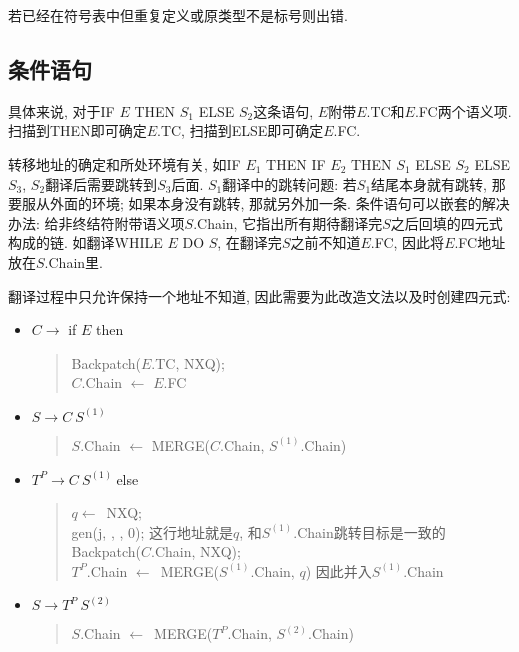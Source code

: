                 若已经在符号表中但重复定义或原类型不是标号则出错.

        \subsection{条件语句}

            具体来说, 对于IF $E$ THEN $S_1$ ELSE $S_2$这条语句, $E$附带$E$.TC和$E$.FC两个语义项. 扫描到THEN即可确定$E$.TC, 扫描到ELSE即可确定$E$.FC.

            转移地址的确定和所处环境有关, 如IF $E_1$ THEN IF $E_2$ THEN $S_1$ ELSE $S_2$ ELSE $S_3$, $S_2$翻译后需要跳转到$S_3$后面. $S_1$翻译中的跳转问题: 若$S_1$结尾本身就有跳转, 那要服从外面的环境; 如果本身没有跳转, 那就另外加一条. 条件语句可以嵌套的解决办法: 给非终结符附带语义项$S$.Chain, 它指出所有期待翻译完$S$之后回填的四元式构成的链. 如翻译WHILE $E$ DO $S$, 在翻译完$S$之前不知道$E$.FC, 因此将$E$.FC地址放在$S$.Chain里.

            翻译过程中只允许保持一个地址不知道, 因此需要为此改造文法以及时创建四元式: 

            \begin{itemize}
                \item $C\to$ if $E$ then 
                    \begin{verse}
                        Backpatch($E$.TC, NXQ); \\
                        $C$.Chain $\gets$ $E$.FC 
                    \end{verse}
                \item $S\to C\ S^{(1)}$ 
                    \begin{verse}
                        $S$.Chain $\gets$ MERGE($C$.Chain, $S^{(1)}$.Chain)
                    \end{verse}
                \item $T^P\to C\ S^{(1)}\ $else 
                    \begin{verse}
                        $q\gets$\ NXQ; \\
                        gen(j, \uline\quad, \uline\quad, 0); \hfill 这行地址就是$q$, 和$S^{(1)}$.Chain跳转目标是一致的 \\
                        Backpatch($C$.Chain, NXQ);  \\
                        $T^P$.Chain $\gets$\ MERGE($S^{(1)}$.Chain, $q$) \hfill 因此并入$S^{(1)}$.Chain
                    \end{verse}
                \item $S\to T^P\ S^{(2)}$ 
                    \begin{verse}
                        $S$.Chain $\gets$\ MERGE($T^P$.Chain, $S^{(2)}$.Chain)
                    \end{verse}
            \end{itemize}

